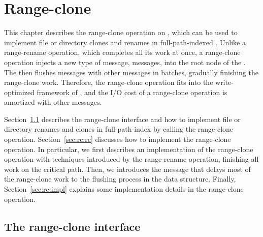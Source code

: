 \chapter{Range-clone}
\label{chap:clone}

This chapter describes the range-clone operation on \bets, which can be used
to implement file or directory clones and renames in full-path-indexed \betrfs.
Unlike a range-rename operation, which completes all its work at once,
a range-clone operation injects a new type of message, \goto messages,
into the root node of the \bet.
The \bet then flushes \goto messages with other messages in batches, gradually
finishing the range-clone work.
Therefore,
the range-clone operation fits into the write-optimized framework of \bets,
and the I/O cost of a range-clone operation is amortized with other messages.


Section~\ref{sec:rc:int} describes the range-clone interface and how to implement
file or directory renames and clones in full-path-index \betrfs by calling the
range-clone operation.
Section~\ref{sec:rc:rc} discusses how to implement the range-clone operation.
In particular, we first describes an implementation of the range-clone operation
with techniques introduced by the range-rename operation,
finishing all work on the critical path.
Then, we introduces the \goto message that delays most of the range-clone work
to the flushing process in the data structure.
Finally, Section~\ref{sec:rc:impl} explains some implementation details in the
range-clone operation.

\section{The range-clone interface}
\label{sec:rc:int}

